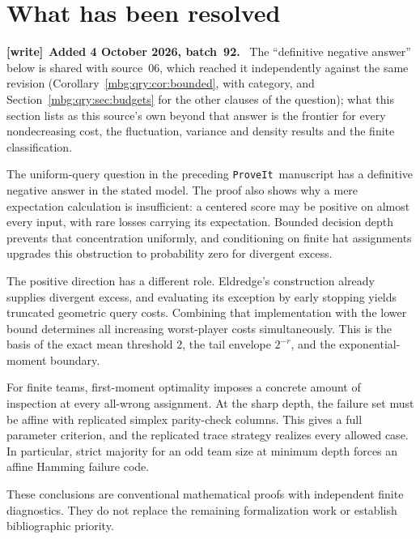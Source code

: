 \documentclass[11pt,letterpaper]{article}
\theoremstyle{definition}
\newcommand{\repo}{\texttt{ProveIt}}
\newenvironment{writenote}[1][]{\par\smallskip\begingroup\small
 \noindent\textbf{[write]}\if\relax\detokenize{#1}\relax\else~\textbf{#1.}\fi\ }%
 {\par\endgroup\smallskip}
\begin{document}
\section{What has been resolved}
\label{mbg:insp:sec:resolved}

\begin{writenote}[Added 4 October 2026, batch~92]
The ``definitive negative answer'' below is shared with source~06, which reached it independently against the same revision (Corollary~\ref{mbg:qry:cor:bounded}, with category, and Section~\ref{mbg:qry:sec:budgets} for the other clauses of the question); what this section lists as this source's own beyond that answer is the frontier for every nondecreasing cost, the fluctuation, variance and density results and the finite classification.
\end{writenote}

The uniform-query question in the preceding \repo\ manuscript has
a definitive negative answer in the stated model. The proof also
shows why a mere expectation calculation is insufficient: a centered
score may be positive on almost every input, with rare losses carrying
its expectation. Bounded decision depth prevents that concentration
uniformly, and conditioning on finite hat assignments upgrades this
obstruction to probability zero for divergent excess.

The positive direction has a different role. Eldredge's construction
already supplies divergent excess, and evaluating its exception by
early stopping yields truncated geometric query costs. Combining that
implementation with the lower bound determines all increasing
worst-player costs simultaneously. This is the basis of the exact
mean threshold \(2\), the tail envelope \(2^{-r}\), and the
exponential-moment boundary.

For finite teams, first-moment optimality imposes a concrete amount
of inspection at every all-wrong assignment. At the sharp depth,
the failure set must be affine with replicated simplex parity-check
columns. This gives a full parameter criterion, and the replicated
trace strategy realizes every allowed case. In particular, strict
majority for an odd team size at minimum depth forces an affine
Hamming failure code.

These conclusions are conventional mathematical proofs with
independent finite diagnostics. They do not replace the remaining
formalization work or establish bibliographic priority.


\clearpage
{}
\end{document}
